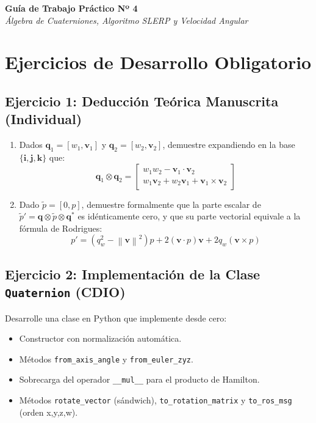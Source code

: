 \documentclass[11pt, a4paper]{article}
\begin{document}
\vspace{0.4cm}
\begin{center}
    \Large\textbf{Guía de Trabajo Práctico Nº 4}\\
    \large\textit{Álgebra de Cuaterniones, Algoritmo SLERP y Velocidad Angular}
\end{center}

\section{Ejercicios de Desarrollo Obligatorio}

\subsection*{Ejercicio 1: Deducción Teórica Manuscrita (Individual)}
\begin{enumerate}
    \item Dados $\mathbf{q}_1 = [w_1, \mathbf{v}_1]$ y $\mathbf{q}_2 = [w_2, \mathbf{v}_2]$, demuestre expandiendo en la base $\{\mathbf{i}, \mathbf{j}, \mathbf{k}\}$ que:
    \begin{equation*}
        \mathbf{q}_1 \otimes \mathbf{q}_2 = \begin{bmatrix} w_1 w_2 - \mathbf{v}_1 \cdot \mathbf{v}_2 \\ w_1 \mathbf{v}_2 + w_2 \mathbf{v}_1 + \mathbf{v}_1 \times \mathbf{v}_2 \end{bmatrix}
    \end{equation*}
    \item Dado $\tilde{p} = [0, p]$, demuestre formalmente que la parte escalar de $\tilde{p}' = \mathbf{q} \otimes \tilde{p} \otimes \mathbf{q}^*$ es idénticamente cero, y que su parte vectorial equivale a la fórmula de Rodrigues:
    \begin{equation*}
        p' = (q_w^2 - \left\|\mathbf{v}\right\|^2) p + 2(\mathbf{v} \cdot p)\mathbf{v} + 2 q_w (\mathbf{v} \times p)
    \end{equation*}
\end{enumerate}

\subsection*{Ejercicio 2: Implementación de la Clase \texttt{Quaternion} (CDIO)}
Desarrolle una clase en Python que implemente desde cero:
\begin{itemize}[label=$\circ$]
    \item Constructor con normalización automática.
    \item Métodos \texttt{from\_axis\_angle} y \texttt{from\_euler\_zyz}.
    \item Sobrecarga del operador \texttt{\_\_mul\_\_} para el producto de Hamilton.
    \item Métodos \texttt{rotate\_vector} (sándwich), \texttt{to\_rotation\_matrix} y \texttt{to\_ros\_msg} (orden x,y,z,w).
\end{itemize}
\end{document}
